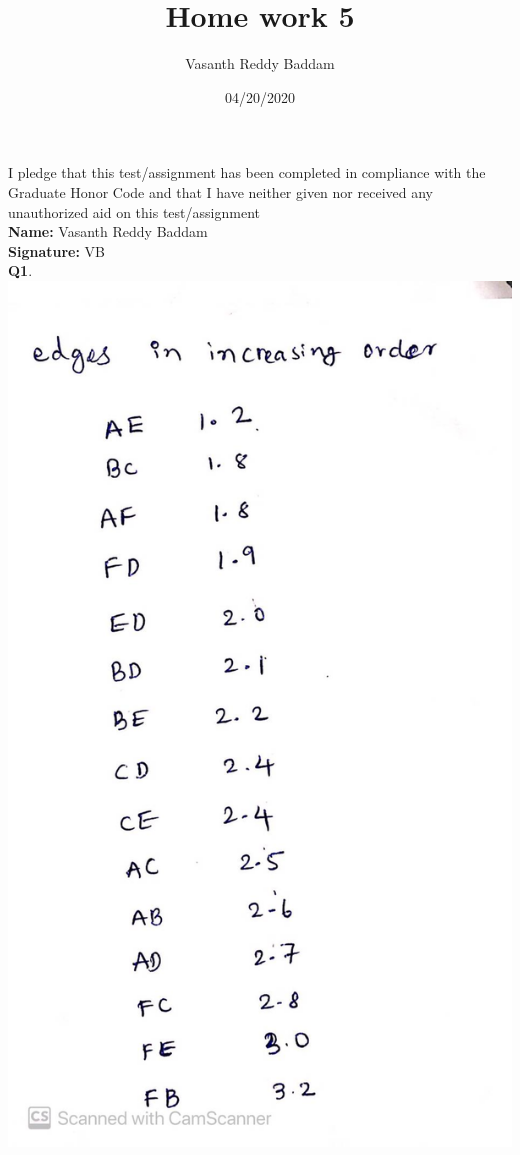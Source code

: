 \documentclass[11pt]{article}
\title{Home work 5}
\author{Vasanth Reddy Baddam}
\date{04/20/2020}
\begin{document}
\maketitle
I pledge that this test/assignment has been completed in compliance with the Graduate Honor Code and
that I have neither given nor received any unauthorized aid on this test/assignment\\
\textbf{Name: } Vasanth Reddy Baddam\\
\textbf{Signature: } VB\\
\hline
\vspace{5mm}
\textbf{Q1}.\\
\includegraphics[scale = 0.2]{WhatsApp Image 2020-04-18 at 11.08.04 PM.jpeg}
\end{document}
